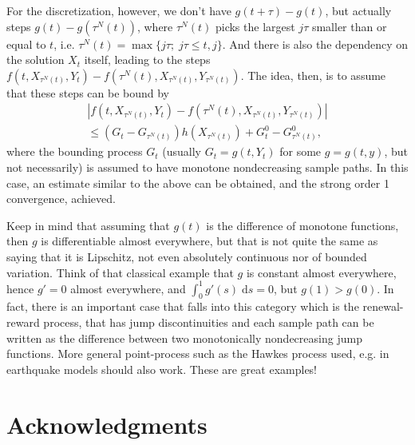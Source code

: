\documentclass[reqno,12pt]{amsart}
\theoremstyle{plain}%
\theoremstyle{definition}
\newcommand{\dontshow}[1]{}
\begin{document}
For the discretization, however, we don't have $g(t+\tau) - g(t)$, but actually steps $g(t) - g(\tau^N(t))$, where $\tau^N(t)$ picks the largest $j\tau$ smaller than or equal to $t$, i.e. $\tau^N(t) = \max\{j\tau; \; j\tau \leq t, j\}$. And there is also the dependency on the solution $X_t$ itself, leading to the steps $f(t, X_{\tau^N(t)}, Y_t) - f(\tau^N(t), X_{\tau^N(t)}, Y_{\tau^N(t)})$. The idea, then, is to assume that these steps can be bound by
\begin{multline*}
  |f(t, X_{\tau^N(t)}, Y_t) - f(\tau^N(t), X_{\tau^N(t)}, Y_{\tau^N(t)})| \\
  \leq (G_t - G_{\tau^N(t)})h(X_{\tau^N(t)}) + G^0_t - G^0_{\tau^N(t)},
\end{multline*}
where the bounding process $G_t$ (usually $G_t = g(t, Y_t)$ for some $g=g(t, y)$, but not necessarily) is assumed to have monotone nondecreasing sample paths. In this case, an estimate similar to the above can be obtained, and the strong order 1 convergence, achieved.

Keep in mind that assuming that $g(t)$ is the difference of monotone functions, then $g$ is differentiable almost everywhere, but that is not quite the same as saying that it is Lipschitz, not even absolutely continuous nor of bounded variation. Think of that classical example that $g$ is constant almost everywhere, hence $g' = 0$ almost everywhere, and $\int_0^1 g'(s) \;\mathrm{d}s = 0$, but $g(1) > g(0)$. In fact, there is an important case that falls into this category which is the renewal-reward process, that has jump discontinuities and each sample path can be written as the difference between two monotonically nondecreasing jump functions. More general point-process such as the Hawkes process used, e.g. in earthquake models should also work. These are great examples!

\dontshow{For the power function $t \mapsto t^\theta$, for $t \geq 0$, with $0<\theta\leq 1$, we have, for $t > s \geq 0$,
\begin{align*}
    \frac{|t^{\theta} - s^{\theta}|}{|t - s|^\theta} = \frac{\left|1 - \left(\frac{s}{t}\right)^\theta\right|}{\left|1 - \left(\frac{s}{t}\right)\right|^\theta} \leq \frac{\left|1 - \left(\frac{s}{t}\right)\right|}{\left|1 - \left(\frac{s}{t}\right)\right|} = 1,
\end{align*}
where we used that $(s/t)^\theta \geq (s/t)$, since $0 \leq s/t < 1$ and $0 < \theta \leq 1$, and, similarly, that $(1 - s/t)^\theta \geq (1 - s/t)$. This shows that $t \mapsto t^\theta$ is H\"older continuous with H\"older exponent $\theta$ and H\"older constant $1$.
}


\section*{Acknowledgments}


\begin{thebibliography}{25}


\end{thebibliography}
\end{document}
